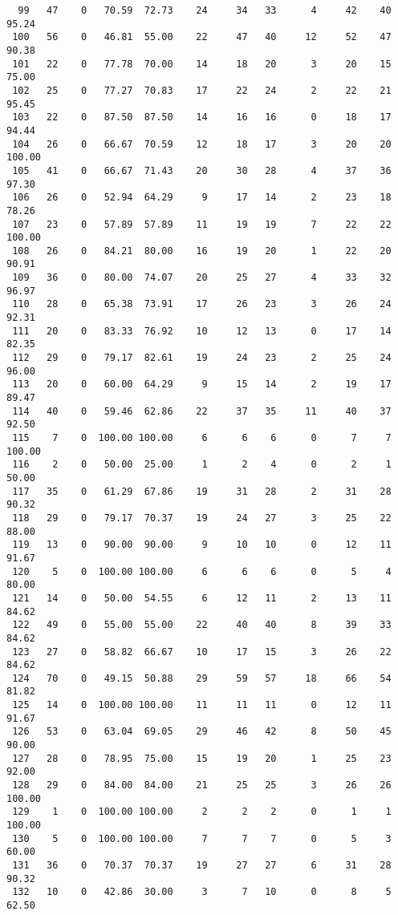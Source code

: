 \begin{verbatim}
  99   47    0   70.59  72.73    24     34   33      4     42    40    95.24
 100   56    0   46.81  55.00    22     47   40     12     52    47    90.38
 101   22    0   77.78  70.00    14     18   20      3     20    15    75.00
 102   25    0   77.27  70.83    17     22   24      2     22    21    95.45
 103   22    0   87.50  87.50    14     16   16      0     18    17    94.44
 104   26    0   66.67  70.59    12     18   17      3     20    20   100.00
 105   41    0   66.67  71.43    20     30   28      4     37    36    97.30
 106   26    0   52.94  64.29     9     17   14      2     23    18    78.26
 107   23    0   57.89  57.89    11     19   19      7     22    22   100.00
 108   26    0   84.21  80.00    16     19   20      1     22    20    90.91
 109   36    0   80.00  74.07    20     25   27      4     33    32    96.97
 110   28    0   65.38  73.91    17     26   23      3     26    24    92.31
 111   20    0   83.33  76.92    10     12   13      0     17    14    82.35
 112   29    0   79.17  82.61    19     24   23      2     25    24    96.00
 113   20    0   60.00  64.29     9     15   14      2     19    17    89.47
 114   40    0   59.46  62.86    22     37   35     11     40    37    92.50
 115    7    0  100.00 100.00     6      6    6      0      7     7   100.00
 116    2    0   50.00  25.00     1      2    4      0      2     1    50.00
 117   35    0   61.29  67.86    19     31   28      2     31    28    90.32
 118   29    0   79.17  70.37    19     24   27      3     25    22    88.00
 119   13    0   90.00  90.00     9     10   10      0     12    11    91.67
 120    5    0  100.00 100.00     6      6    6      0      5     4    80.00
 121   14    0   50.00  54.55     6     12   11      2     13    11    84.62
 122   49    0   55.00  55.00    22     40   40      8     39    33    84.62
 123   27    0   58.82  66.67    10     17   15      3     26    22    84.62
 124   70    0   49.15  50.88    29     59   57     18     66    54    81.82
 125   14    0  100.00 100.00    11     11   11      0     12    11    91.67
 126   53    0   63.04  69.05    29     46   42      8     50    45    90.00
 127   28    0   78.95  75.00    15     19   20      1     25    23    92.00
 128   29    0   84.00  84.00    21     25   25      3     26    26   100.00
 129    1    0  100.00 100.00     2      2    2      0      1     1   100.00
 130    5    0  100.00 100.00     7      7    7      0      5     3    60.00
 131   36    0   70.37  70.37    19     27   27      6     31    28    90.32
 132   10    0   42.86  30.00     3      7   10      0      8     5    62.50

\end{verbatim}
